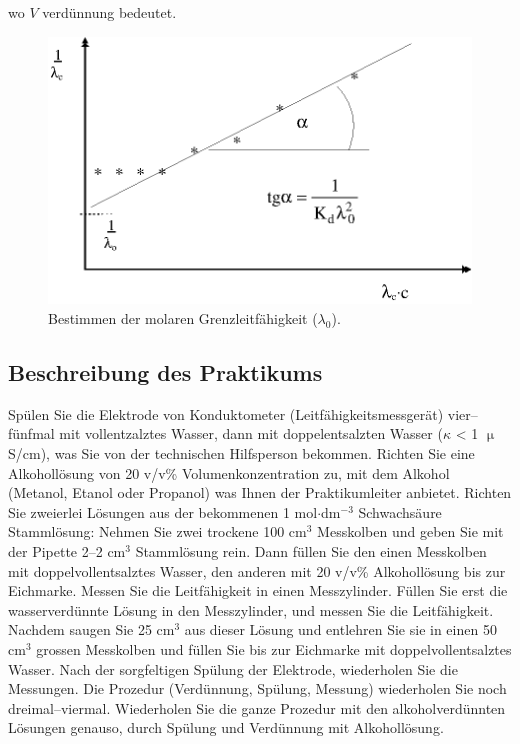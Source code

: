 wo $V$ verdünnung bedeutet.

\begin{figure}[h!]
\centering
\includegraphics{fig/lambda0.eps}
\caption{Bestimmen der molaren Grenzleitfähigkeit ($\lambda_0$).}
\label{fig:}
\end{figure}

\subsection{Beschreibung des Praktikums}

Spülen Sie die Elektrode von Konduktometer (Leitfähigkeitsmessgerät) vier--fünfmal mit vollentzalztes Wasser, dann mit doppelentsalzten Wasser ($\kappa$ < 1 $\upmu$S/cm), was Sie von der technischen Hilfsperson bekommen.
Richten Sie eine Alkohollösung von 20 v/v\% Volumenkonzentration zu, mit dem Alkohol (Metanol, Etanol oder Propanol) was Ihnen der Praktikumleiter anbietet.
Richten Sie zweierlei Lösungen aus der bekommenen 1 mol$\cdot$dm$^{-3}$ Schwachsäure Stammlösung:
Nehmen Sie zwei trockene 100 cm$^3$ Messkolben und geben Sie mit der Pipette 2--2 cm$^3$ Stammlösung rein.
Dann füllen Sie den einen Messkolben mit doppelvollentsalztes Wasser, den anderen mit 20 v/v\% Alkohollösung bis zur Eichmarke.
Messen Sie die Leitfähigkeit in einen Messzylinder.
Füllen Sie erst die wasserverdünnte Lösung in den Messzylinder, und messen Sie die Leitfähigkeit.
Nachdem saugen Sie 25 cm$^3$ aus dieser Lösung und entlehren Sie sie in einen 50 cm$^3$ grossen Messkolben und füllen Sie bis zur Eichmarke mit doppelvollentsalztes Wasser.
Nach der sorgfeltigen Spülung der Elektrode, wiederholen Sie die Messungen.
Die Prozedur (Verdünnung, Spülung, Messung) wiederholen Sie noch dreimal--viermal.
Wiederholen Sie die ganze Prozedur mit den alkoholverdünnten Lösungen genauso, durch Spülung und Verdünnung mit Alkohollösung.

